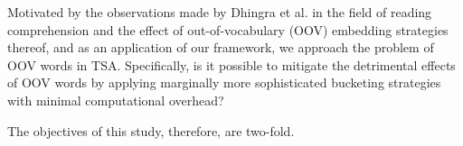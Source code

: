 \documentclass[../../fyp.tex]{subfiles}
\begin{document}



Motivated by the observations made by Dhingra et al. \cite{bhuwandhingra2017} in the field of reading comprehension and the effect of out-of-vocabulary (OOV) embedding strategies thereof, and as an application of our framework, we approach the problem of OOV words in TSA. Specifically, is it possible to mitigate the detrimental effects of OOV words by applying marginally more sophisticated bucketing strategies with minimal computational overhead?

The objectives of this study, therefore, are two-fold.
\end{document}

